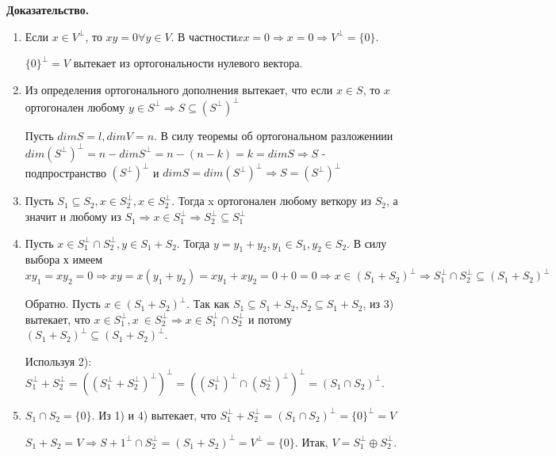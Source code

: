 \documentclass[a4paper]{article}
\begin{document}
\begin{hproof}
\textbf{Доказательство.}
\begin{enumerate}
\item Если $x \in V^{\bot}$, то $xy = 0 \forall y \in V$. В частности$xx = 0\Rightarrow x = 0 \Rightarrow V^{\bot} = \{ 0 \}$.

$\{ 0 \}^{\bot} = V$ вытекает из ортогональности нулевого вектора.

\item Из определения ортогонального дополнения вытекает, что если $x \in S$, то $x$ ортогонален любому $y \in S^{\bot} \Rightarrow S \subseteq (S^{\bot})^{\bot}$

Пусть $dimS = l, dimV = n$. В силу теоремы об ортогональном разложениии $dim (S^{\bot})^{\bot} = n - dim S^{\bot} = n-(n-k) = k = dimS \Rightarrow S$ - подпространство $(S^{\bot})^{\bot}$ и $dimS = dim (S^{\bot})^{\bot} \Rightarrow S = (S^{\bot})^{\bot}$

\item Пусть $S_1 \subseteq S_2, x \in S_2^{\bot}, x \in S_2^{\bot}$. Тогда x ортогонален любому веткору из $S_2$, а значит и любому из $S_1 \Rightarrow x \in S_1^{\bot} \Rightarrow S_2^{\bot} \subseteq S_1^{\bot}$

\item Пусть $x \in S_1^{\bot} \cap S_2^{\bot}, y \in S_1+S_2$. Тогда $y=y_1+y_2, y_1 \in S_1, y_2 \in S_2$. В силу выбора х имеем $xy_1 = xy_2 = 0 \Rightarrow xy = x(y_1+y_2) = xy_1 + xy_2 = 0+0=0 \Rightarrow x \in (S_1 + S_2)^{\bot} \Rightarrow S_1^{\bot} \cap S_2^{\bot} \subseteq (S_1+S_2)^{\bot}$ 



Обратно. Пусть $x \in (S_1+S_2)^{\bot}$. Так как $S_1 \subseteq S_1+S_2, S_2 \subseteq S_1+S_2$, из 3) вытекает, что $x \in S_1^{\bot}, x\ \in S_2^{\bot} \Rightarrow x \in S_1^{\bot} \cap S_2^{\bot}$ и потому $(S_1 + S_2)^{\bot} \subseteq (S_1+S_2)^{\bot}$.

Используя 2): $S_1^{\bot} + S_2^{\bot} = ((S_1^{\bot} + S_2^{\bot})^{\bot})^{\bot} = ((S_1^{\bot})^{\bot} \cap (S_2^{\bot})^{\bot})^{\bot} = (S_1 \cap S_2)^{\bot}$.

\item $S_1 \cap S_2 = \{ 0 \}$. Из 1) и 4) вытекает, что $S_1^{\bot} + S_2^{\bot} = (S_1 \cap S_2)^{\bot} = \{ 0 \}^{\bot} = V$

$S_1+S_2 = V \Rightarrow S+1^{\bot} \cap S_2^{\bot} = (S_1 + S_2)^{\bot} = V^{\bot} = \{ 0 \}$. Итак, $V = S_1^{\bot} \oplus S_2^{\bot}$.
\end{enumerate}
\end{hproof}
\end{document}
